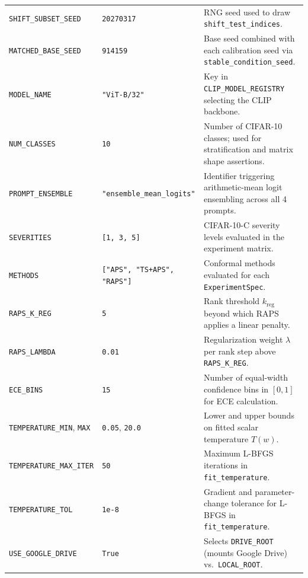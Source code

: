 \documentclass[11pt,a4paper]{article}
\begin{document}
{\begin{longtable}{P{0.31\textwidth} P{0.20\textwidth} P{0.42\textwidth}}
\texttt{SHIFT\_\allowbreak{}SUBSET\_\allowbreak{}SEED} & \texttt{20270317} & RNG seed used to draw \texttt{shift\_\allowbreak{}test\_\allowbreak{}indices}. \\
\texttt{MATCHED\_\allowbreak{}BASE\_\allowbreak{}SEED} & \texttt{914159} & Base seed combined with each calibration seed via \texttt{stable\_\allowbreak{}condition\_\allowbreak{}seed}. \\
\texttt{MODEL\_\allowbreak{}NAME} & \texttt{"ViT-B/\allowbreak{}32"} & Key in \texttt{CLIP\_\allowbreak{}MODEL\_\allowbreak{}REGISTRY} selecting the CLIP backbone. \\
\texttt{NUM\_\allowbreak{}CLASSES} & \texttt{10} & Number of CIFAR-10 classes; used for stratification and matrix shape assertions. \\
\texttt{PROMPT\_\allowbreak{}ENSEMBLE} & \texttt{"ensemble\_\allowbreak{}mean\_\allowbreak{}logits"} & Identifier triggering arithmetic-mean logit ensembling across all 4 prompts. \\
\texttt{SEVERITIES} & \texttt{[1, 3, 5]} & CIFAR-10-C severity levels evaluated in the experiment matrix. \\
\texttt{METHODS} & \texttt{["APS", "TS+APS", "RAPS"]} & Conformal methods evaluated for each \texttt{ExperimentSpec}. \\
\texttt{RAPS\_\allowbreak{}K\_\allowbreak{}REG} & \texttt{5} & Rank threshold $k_{\text{reg}}$ beyond which RAPS applies a linear penalty. \\
\texttt{RAPS\_\allowbreak{}LAMBDA} & \texttt{0.01} & Regularization weight $\lambda$ per rank step above \texttt{RAPS\_\allowbreak{}K\_\allowbreak{}REG}. \\
\texttt{ECE\_\allowbreak{}BINS} & \texttt{15} & Number of equal-width confidence bins in $[0, 1]$ for ECE calculation. \\
\texttt{TEMPERATURE\_\allowbreak{}MIN}, \texttt{MAX} & \texttt{0.05}, \texttt{20.0} & Lower and upper bounds on fitted scalar temperature $T(w)$. \\
\texttt{TEMPERATURE\_\allowbreak{}MAX\_\allowbreak{}ITER} & \texttt{50} & Maximum L-BFGS iterations in \texttt{fit\_\allowbreak{}temperature}. \\
\texttt{TEMPERATURE\_\allowbreak{}TOL} & \texttt{1e-8} & Gradient and parameter-change tolerance for L-BFGS in \texttt{fit\_\allowbreak{}temperature}. \\
\texttt{USE\_\allowbreak{}GOOGLE\_\allowbreak{}DRIVE} & \texttt{True} & Selects \texttt{DRIVE\_\allowbreak{}ROOT} (mounts Google Drive) vs.\ \texttt{LOCAL\_\allowbreak{}ROOT}. \\

\end{longtable}}
\end{document}
